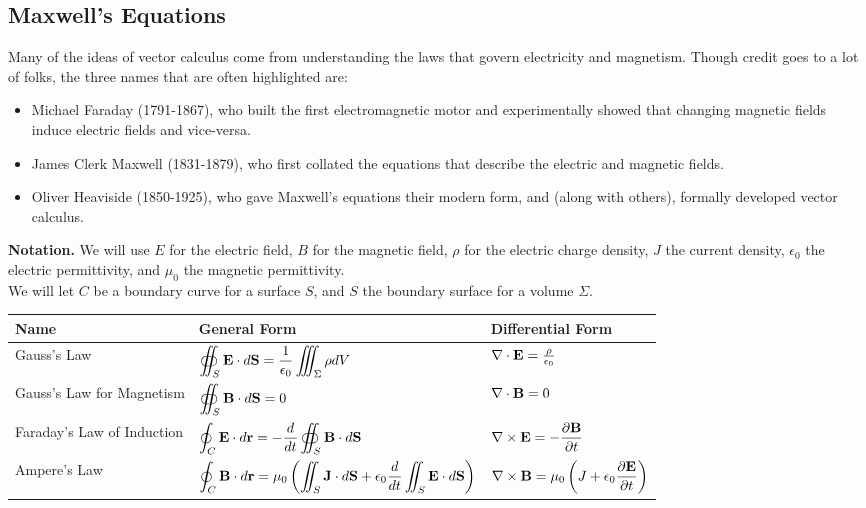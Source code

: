 \subsection{Maxwell's Equations}

Many of the ideas of vector calculus come from understanding the laws that govern electricity and magnetism. Though credit goes to a lot of folks, the three names that are often highlighted are:
\begin{itemize}
    \item Michael Faraday (1791-1867), who built the first electromagnetic motor and experimentally showed that changing magnetic fields induce electric fields and vice-versa.
    \item James Clerk Maxwell (1831-1879), who first collated the equations that describe the electric and magnetic fields.
    \item Oliver Heaviside (1850-1925), who gave Maxwell’s equations their modern form, and (along with others), formally developed vector calculus.
\end{itemize}
\textbf{Notation.} We will use \(E\) for the electric field, \(B\) for the magnetic field, \(\rho\) for the electric charge density, \(J\) the current density, \(\epsilon_0\) the electric permittivity, and \(\mu_0\) the magnetic permittivity. \\

We will let \(C\) be a boundary curve for a surface \(S\), and \(S\) the boundary surface for a volume \(\Sigma\). 

\newpage

\begin{footnotesize}
\begin{tabular}[htbp]{lll}
    \toprule
    \textbf{Name} & \textbf{General Form} & \textbf{Differential Form} \\ \midrule
    Gauss's Law & \(\displaystyle \oiint_{S} \mathbf{E} \cdot d\mathbf{S} = \frac{1}{\epsilon_{0}} \iiint_{\Sigma} \rho dV\) & \(\nabla \cdot \mathbf{E} = \frac{\rho}{\epsilon_{0}}\) \\ \midrule
    Gauss's Law for Magnetism & \(\displaystyle \oiint_{S} \mathbf{B} \cdot d\mathbf{S} = 0\) & \(\nabla \cdot \mathbf{B} = 0\) \\ \midrule
    Faraday's Law of Induction & \(\displaystyle \oint_{C} \mathbf{E} \cdot d\mathbf{r} = -\frac{d}{dt} \oiint_{S} \mathbf{B} \cdot d\mathbf{S}\) & \(\displaystyle \nabla \times \mathbf{E} = -\frac{\partial \mathbf{B}}{\partial t}\) \\ \midrule
    Ampere's Law & \(\displaystyle \oint_{C} \mathbf{B} \cdot d\mathbf{r} = \mu_{0}\left(\iint_{S}\mathbf{J} \cdot d\mathbf{S} + \epsilon_{0} \frac{d}{dt} \iint_{S} \mathbf{E} \cdot d\mathbf{S}\right)\) & \(\displaystyle \nabla \times \mathbf{B} = \mu_{0} \left(J + \epsilon_{0} \frac{\partial \mathbf{E}}{\partial t}\right)\) \\ \bottomrule
\end{tabular}
\end{footnotesize}

